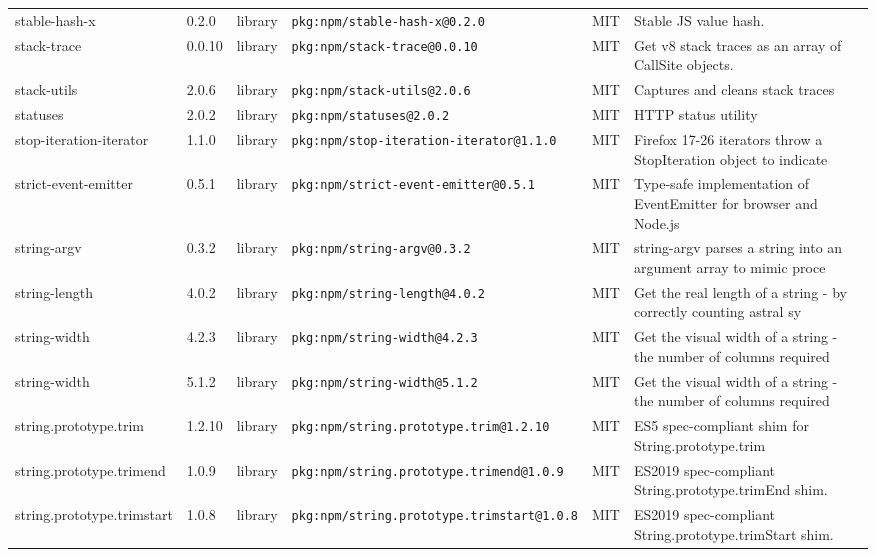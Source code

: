 \documentclass[11pt,a4paper]{article}
\begin{document}
\begin{longtable}{|p{4cm}|p{2cm}|p{1.6cm}|p{5cm}|p{1.5cm}|p{3.5cm}|}
\raggedright stable-hash-x & 0.2.0 & library & \small\texttt{pkg:npm/stable-hash-x@0.2.0} & MIT & \small Stable JS value hash. \\
\raggedright stack-trace & 0.0.10 & library & \small\texttt{pkg:npm/stack-trace@0.0.10} & MIT & \small Get v8 stack traces as an array of CallSite objects. \\
\raggedright stack-utils & 2.0.6 & library & \small\texttt{pkg:npm/stack-utils@2.0.6} & MIT & \small Captures and cleans stack traces \\
\raggedright statuses & 2.0.2 & library & \small\texttt{pkg:npm/statuses@2.0.2} & MIT & \small HTTP status utility \\
\raggedright stop-iteration-iterator & 1.1.0 & library & \small\texttt{pkg:npm/stop-iteration-iterator@1.1.0} & MIT & \small Firefox 17-26 iterators throw a StopIteration object to indicate  \\
\raggedright strict-event-emitter & 0.5.1 & library & \small\texttt{pkg:npm/strict-event-emitter@0.5.1} & MIT & \small Type-safe implementation of EventEmitter for browser and Node.js \\
\raggedright string-argv & 0.3.2 & library & \small\texttt{pkg:npm/string-argv@0.3.2} & MIT & \small string-argv parses a string into an argument array to mimic proce \\
\raggedright string-length & 4.0.2 & library & \small\texttt{pkg:npm/string-length@4.0.2} & MIT & \small Get the real length of a string - by correctly counting astral sy \\
\raggedright string-width & 4.2.3 & library & \small\texttt{pkg:npm/string-width@4.2.3} & MIT & \small Get the visual width of a string - the number of columns required \\
\raggedright string-width & 5.1.2 & library & \small\texttt{pkg:npm/string-width@5.1.2} & MIT & \small Get the visual width of a string - the number of columns required \\
\raggedright string.prototype.trim & 1.2.10 & library & \small\texttt{pkg:npm/string.prototype.trim@1.2.10} & MIT & \small ES5 spec-compliant shim for String.prototype.trim \\
\raggedright string.prototype.trimend & 1.0.9 & library & \small\texttt{pkg:npm/string.prototype.trimend@1.0.9} & MIT & \small ES2019 spec-compliant String.prototype.trimEnd shim. \\
\raggedright string.prototype.trimstart & 1.0.8 & library & \small\texttt{pkg:npm/string.prototype.trimstart@1.0.8} & MIT & \small ES2019 spec-compliant String.prototype.trimStart shim. \\

\end{longtable}
\end{document}
